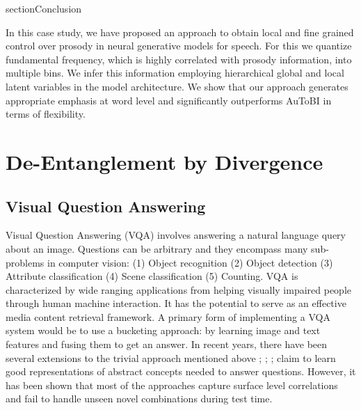 section{Conclusion}

In this case study, we have proposed an approach to obtain local and fine grained control over prosody in neural generative models for speech. For this we quantize fundamental frequency, which is highly correlated with prosody information, into multiple bins. We infer this information employing hierarchical global and local latent variables in the model architecture.  We show that our approach generates appropriate emphasis at word level and significantly outperforms AuToBI in terms of flexibility.  

\chapter{De-Entanglement by Divergence}

\section{Visual Question Answering}

Visual Question Answering (VQA) involves answering a natural language query about an image. Questions can be arbitrary and they encompass many sub-problems in computer vision: (1) Object recognition %
(2) Object detection %
(3) Attribute classification %
(4) Scene classification %
(5) Counting. %
VQA is characterized by wide ranging applications from helping visually impaired people through human machine interaction. It has the potential to serve as an effective media content retrieval framework. 
A primary form of implementing a VQA system would be to use a bucketing approach: by learning image and text features and fusing them to get an answer. In recent years, there have been several extensions to the trivial approach mentioned above \cite{fukui2016multimodal}; \cite{lu2016hierarchical}; \cite{yang2016stacked}; \cite{lu2015deeper} claim to learn good representations of abstract concepts needed to answer questions. However, it has been shown \cite{agrawal2017c} that most of the approaches capture surface level correlations and fail to handle unseen novel combinations during test time. 

